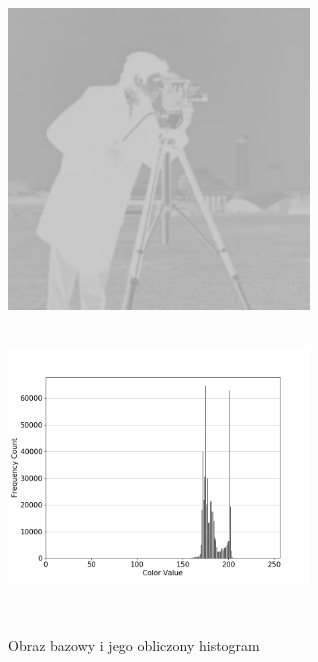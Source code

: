 \documentclass[a4paper,12pt]{book}
\begin{document}
\begin{figure}[H]
	\label{fig:man-bright-histogram}
	\caption{Obraz bazowy i jego obliczony histogram}
	\includegraphics[width=8cm, height=8cm]{man-bright-unmodified.png}
	\includegraphics[width=8cm, height=8cm]{5-1/calculate-photoman-bright.png}
\end{figure}
\end{document}
